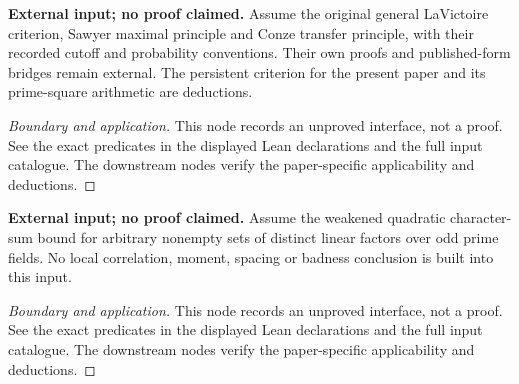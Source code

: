 \begin{lemma}
\label{input_badness}
\textbf{External input; no proof claimed.} Assume the original general LaVictoire criterion, Sawyer maximal principle and Conze transfer principle, with their recorded cutoff and probability conventions. Their own proofs and published-form bridges remain external. The persistent criterion for the present paper and its prime-square arithmetic are deductions.
\end{lemma}
\begin{proof}[Boundary and application]
This node records an unproved interface, not a proof. See the exact predicates in the displayed Lean declarations and the full input catalogue. The downstream nodes verify the paper-specific applicability and deductions.
\end{proof}

\begin{lemma}
\label{input_weil}
\textbf{External input; no proof claimed.} Assume the weakened quadratic character-sum bound for arbitrary nonempty sets of distinct linear factors over odd prime fields. No local correlation, moment, spacing or badness conclusion is built into this input.
\end{lemma}
\begin{proof}[Boundary and application]
This node records an unproved interface, not a proof. See the exact predicates in the displayed Lean declarations and the full input catalogue. The downstream nodes verify the paper-specific applicability and deductions.
\end{proof}

